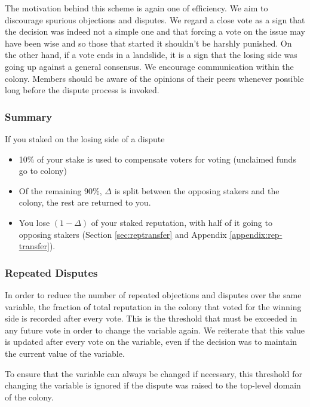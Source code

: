 The motivation behind this scheme is again one of efficiency. We aim to discourage spurious objections and disputes. We regard a close vote as a sign that the decision was indeed not a simple one and that forcing a vote on the issue may have been wise and so those that started it shouldn't be harshly punished. On the other hand, if a vote ends in a landslide, it is a sign that the losing side was going up against a general consensus. We encourage communication within the colony. Members should be aware of the opinions of their peers whenever possible long before the dispute process is invoked.

\subsubsection*{Summary}
If you staked on the losing side of a dispute
\begin{itemize}
 \item 10\% of your stake is used to compensate voters for voting (unclaimed funds go to colony)
 \item Of the remaining 90\%, $\Delta$ is split between the opposing stakers and the colony, the rest are returned to you.
 \item You lose $(1-\Delta)$ of your staked reputation, with half of it going to opposing stakers (Section \ref{sec:reptransfer} and Appendix \ref{appendix:rep-transfer}).
\end{itemize}


\subsubsection{Repeated Disputes}\label{sec:repeated-disputes}
In order to reduce the number of repeated objections and disputes over the same variable, the fraction of total reputation in the colony that voted for the winning side is recorded after every vote. This is the threshold that must be exceeded in any future vote in order to change the variable again. We reiterate that this value is updated after every vote on the variable, even if the decision was to maintain the current value of the variable.

To ensure that the variable can always be changed if necessary, this threshold for changing the variable is ignored if the dispute was raised to the top-level domain of the colony.

